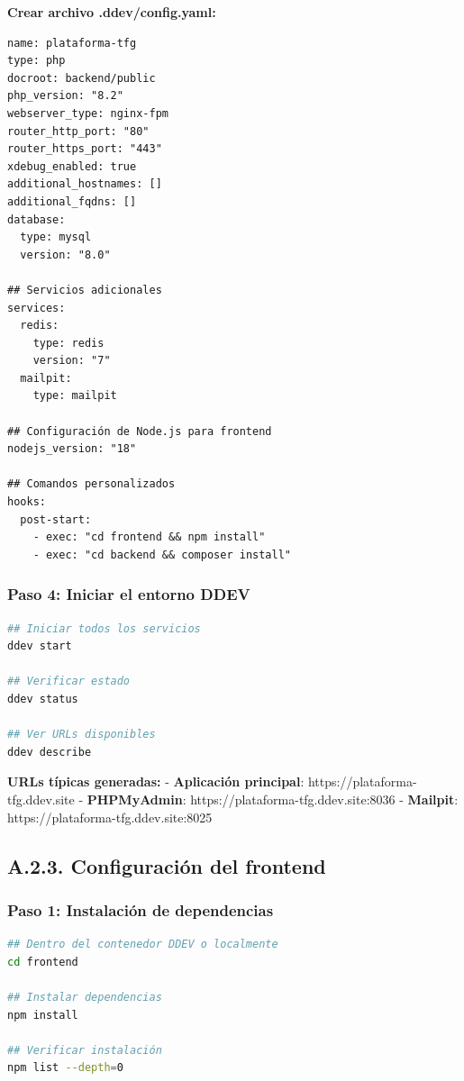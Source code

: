 \documentclass[12pt,a4paper,oneside]{report}
\begin{document}
\textbf{Crear archivo .ddev/config.yaml:}

\begin{lstlisting}
name: plataforma-tfg
type: php
docroot: backend/public
php_version: "8.2"
webserver_type: nginx-fpm
router_http_port: "80"
router_https_port: "443"
xdebug_enabled: true
additional_hostnames: []
additional_fqdns: []
database:
  type: mysql
  version: "8.0"
  
## Servicios adicionales
services:
  redis:
    type: redis
    version: "7"
  mailpit:
    type: mailpit

## Configuración de Node.js para frontend
nodejs_version: "18"

## Comandos personalizados
hooks:
  post-start:
    - exec: "cd frontend && npm install"
    - exec: "cd backend && composer install"
\end{lstlisting}

\subsubsection{Paso 4: Iniciar el entorno
DDEV}\label{paso-4-iniciar-el-entorno-ddev}

\begin{lstlisting}[language=bash]
## Iniciar todos los servicios
ddev start

## Verificar estado
ddev status

## Ver URLs disponibles
ddev describe
\end{lstlisting}

\textbf{URLs típicas generadas:} - \textbf{Aplicación principal}:
https://plataforma-tfg.ddev.site - \textbf{PHPMyAdmin}:
https://plataforma-tfg.ddev.site:8036 - \textbf{Mailpit}:
https://plataforma-tfg.ddev.site:8025

\subsection{A.2.3. Configuración del
frontend}\label{a.2.3.-configuraciuxf3n-del-frontend}

\subsubsection{Paso 1: Instalación de
dependencias}\label{paso-1-instalaciuxf3n-de-dependencias}

\begin{lstlisting}[language=bash]
## Dentro del contenedor DDEV o localmente
cd frontend

## Instalar dependencias
npm install

## Verificar instalación
npm list --depth=0
\end{lstlisting}
\end{document}
